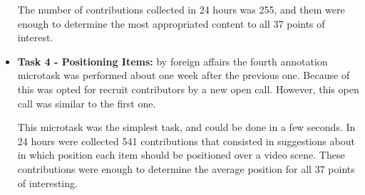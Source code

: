 \begin{itemize}
		The number of contributions collected in 24 hours was 255, and them were enough to determine the most appropriated content to all 37 points of interest.
	
		\item \textbf{Task 4 - Positioning Items:} by foreign affairs the fourth annotation microtask was performed about one week after the previous one. Because of this was opted for recruit contributors by a new open call. However, this open call was similar to the first one.
		
This microtask was the simplest task, and could be done in a few seconds. In 24 hours were collected 541 contributions that consisted in suggestions about in which position each item should be positioned over a video scene. These contributions were enough to determine the average position for all 37 points of interesting.
		
	\end{itemize}
		
